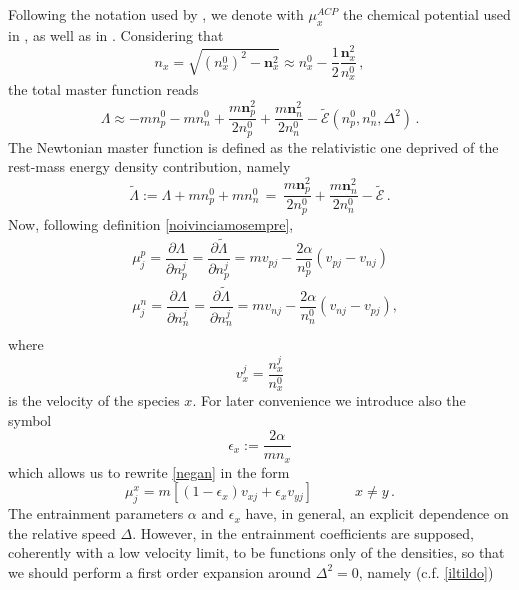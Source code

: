 \documentclass[usenatbib]{mnras}
\newcommand{\vect}[1]{\mathbf{{#1}}}
\newcommand{\spc}{\quad \quad \quad}
\begin{document}
Following the notation used by 
\cite{KP2017}, we denote with $\mu_x^{ACP}$ the chemical potential used in \cite{acp2004}, as well as in \cite{prix2004}. Considering that
%
\begin{equation}
n_x = \sqrt{(n_x^0)^2 - \vect{n}_x^2} \approx n_x^0 - \dfrac{1}{2} \dfrac{\vect{n}_x^2}{n_x^0} \, ,
\end{equation}
%
the total master function reads
%
\begin{equation}
\Lambda \approx  -m n_p^0- m n_n^0 + \dfrac{m  \vect{n}_p^2}{2 n_p^0} + \dfrac{m  \vect{n}_n^2}{2 n_n^0} 
- 
\tilde{\mathcal{E}} (n_p^0,n_n^0,\Delta^2) \, . 
\end{equation}
%
The Newtonian master function is defined as the relativistic one deprived of the rest-mass energy density contribution, namely
%
\begin{equation}
\label{rinormalizzoduro}
\tilde{\Lambda}:= \Lambda+ m n_p^0 +m n_n^0
\, = \, 
\dfrac{m \vect{n}_p^2}{2 n_p^0} + \dfrac{m \vect{n}_n^2}{2 n_n^0} - \tilde{\mathcal{E}} \, .
\end{equation}
%
Now, following definition \eqref{noivinciamosempre},
%
\begin{equation}\label{negan}
\begin{split}
& \mu^p_j = \dfrac{\partial \Lambda}{\partial n_p^j} = \dfrac{\partial \tilde{\Lambda}}{\partial n_p^j} = m  v_{pj} - \dfrac{2\alpha}{n_p^0} (v_{pj}-v_{nj})  \\
& \mu^n_j = \dfrac{\partial \Lambda}{\partial n_n^j} = \dfrac{\partial \tilde{\Lambda}}{\partial n_n^j} = m  v_{nj} - \dfrac{2\alpha}{n_n^0} (v_{nj}-v_{pj}),  \\
\end{split}
\end{equation}
%
where
%
\begin{equation}
v_x^j = \dfrac{n_x^j}{n_x^0}
\end{equation}
%
is the velocity of the species $x$. For later convenience we introduce also the symbol 
%
\begin{equation}\label{epsilonnn}
\epsilon_x := \dfrac{2 \alpha}{m  n_x} 
\end{equation} 
%
which allows us to rewrite \eqref{negan} in the form
%
\begin{equation}\label{grimes}
\mu^x_j = m [(1-\epsilon_x)v_{xj} + \epsilon_x v_{yj}] \spc x \neq y \, .
\end{equation}
%
The entrainment parameters $\alpha$ and $\epsilon_x$ have, in general, an explicit dependence on the relative speed $\Delta$. However, in  \cite{KP2017} the entrainment coefficients are supposed, coherently with a low velocity limit, to be functions only of the densities, so that we should perform a first order expansion around $\Delta^2=0$, namely (c.f. \ref{iltildo})
\end{document}

